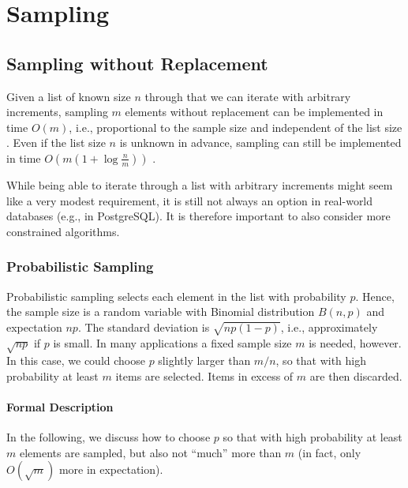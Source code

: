 
\chapter{Sampling}

\section{Sampling without Replacement} \label{sec:SampingWOReplacement}

Given a list of known size $n$ through that we can iterate with arbitrary increments, sampling $m$ elements without replacement can be implemented in time $O(m)$, i.e., proportional to the sample size and independent of the list size \cite{V84a}. Even if the list size $n$ is unknown in advance, sampling can still be implemented in time $O(m(1 + \log \frac nm))$ \cite{V85a}.

While being able to iterate through a list with arbitrary increments might seem like a very modest requirement, it is still not always an option in real-world databases (e.g., in PostgreSQL). It is therefore important to also consider more constrained algorithms.

\subsection{Probabilistic Sampling}

Probabilistic sampling selects each element in the list with probability $p$. Hence, the sample size is a random variable with Binomial distribution $B(n, p)$ and expectation $np$. The standard deviation is $\sqrt{np(1 - p)}$, i.e., approximately $\sqrt{np}$ if $p$ is small. In many applications a fixed sample size $m$ is needed, however. In this case, we could choose $p$ slightly larger than $m/n$, so that with high probability at least $m$ items are selected. Items in excess of $m$ are then discarded.

\subsubsection{Formal Description}

In the following, we discuss how to choose $p$ so that with high probability at least $m$ elements are sampled, but also not ``much'' more than $m$ (in fact, only $O(\sqrt m)$ more in expectation).

